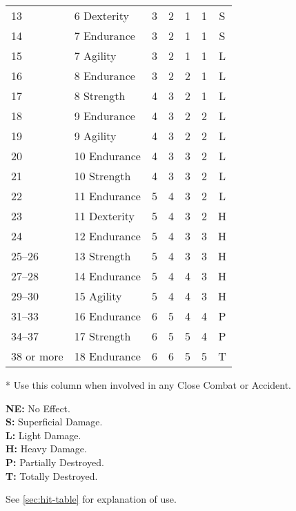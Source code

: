 \begin{table}[htbp]
{\begin{minipage}{5.25in}
\begin{tabular}{llccccc}
        \rowcolor{grey}
        13 & 6 Dexterity & 3 & 2 & 1 & 1 & S\\
        14 & 7 Endurance & 3 & 2 & 1 & 1 & S\\
        \rowcolor{grey}
        15 & 7 Agility & 3 & 2 & 1 & 1 & L\\
        16 & 8 Endurance & 3 & 2 & 2 & 1 & L\\
        \rowcolor{grey}
        17 & 8 Strength & 4 & 3 & 2 & 1 & L\\
        18 & 9 Endurance & 4 & 3 & 2 & 2 & L\\
        \rowcolor{grey}
        19 & 9 Agility & 4 & 3 & 2 & 2 & L\\
        20 & 10 Endurance & 4 & 3 & 3 & 2 & L\\
        \rowcolor{grey}
        21 & 10 Strength & 4 & 3 & 3 & 2 & L\\
        22 & 11 Endurance & 5 & 4 & 3 & 2 & L\\
        \rowcolor{grey}
        23 & 11 Dexterity & 5 & 4 & 3 & 2 & H\\
        24 & 12 Endurance & 5 & 4 & 3 & 3 & H\\
        \rowcolor{grey}
        25--26 & 13 Strength & 5 & 4 & 3 & 3 & H\\
        27--28 & 14 Endurance & 5 & 4 & 4 & 3 & H\\
        \rowcolor{grey}
        29--30 & 15 Agility & 5 & 4 & 4 & 3 & H\\
        31--33 & 16 Endurance & 6 & 5 & 4 & 4 & P\\
        \rowcolor{grey}
        34--37 & 17 Strength & 6 & 5 & 5 & 4 & P\\
        38 or more & 18 Endurance & 6 & 6 & 5 & 5 & T\\
      \end{tabular}

      \medskip

      \parbox{\textwidth}{* Use this column when involved in 
        any Close Combat or Accident.
        
        \medskip

        
        \textbf{NE:} No Effect.\\
        \textbf{S:} Superficial Damage.\\
        \textbf{L:} Light Damage.\\
        \textbf{H:} Heavy Damage.\\
        \textbf{P:} Partially Destroyed.\\
        \textbf{T:} Totally Destroyed.\\

        \medskip

        See \ref{sec:hit-table} for explanation of use.}

      \medskip
    \end{minipage}}
\end{table}


